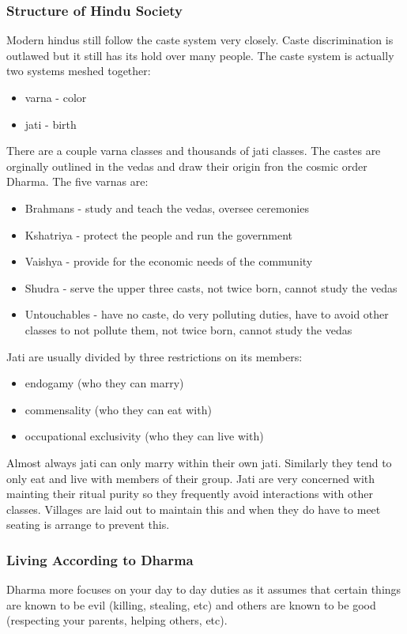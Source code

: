 \documentclass{article}
\begin{document}
\subsubsection*{Structure of Hindu Society}
\label{ssub:structure_of_hindu_society}
Modern hindus still follow the caste system very closely. Caste discrimination is outlawed but it still has its hold over many people. The caste system is actually two systems meshed together:
\begin{itemize}
	\item varna - color
	\item jati - birth
\end{itemize}
There are a couple varna classes and thousands of jati classes. The castes are orginally outlined in the vedas and draw their origin fron the cosmic order Dharma. The five varnas are:
\begin{itemize}
	\item Brahmans - study and teach the vedas, oversee ceremonies
	\item Kshatriya - protect the people and run the government
	\item Vaishya - provide for the economic needs of the community
	\item Shudra - serve the upper three casts, not twice born, cannot study the vedas
	\item Untouchables - have no caste, do very polluting duties, have to avoid other classes to not pollute them, not twice born, cannot study the vedas
\end{itemize}

Jati are usually divided by three restrictions on its members:
\begin{itemize}
	\item endogamy (who they can marry)
	\item commensality (who they can eat with)
	\item occupational exclusivity (who they can live with)
\end{itemize}
Almost always jati can only marry within their own jati. Similarly they tend to only eat and live with members of their group. Jati are very concerned with mainting their ritual purity so they frequently avoid interactions with other classes. Villages are laid out to maintain this and when they do have to meet seating is arrange to prevent this.

\subsubsection*{Living According to Dharma}
\label{ssub:living_according_to_dharma}
Dharma more focuses on your day to day duties as it assumes that certain things are known to be evil (killing, stealing, etc) and others are known to be good (respecting your parents, helping others, etc).
\end{document}
